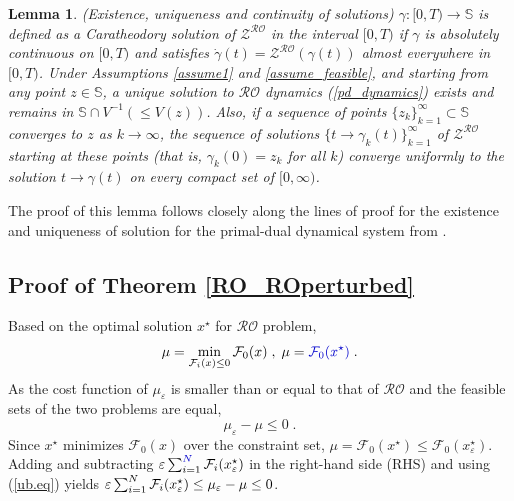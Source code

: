 \documentclass[journal,twoside,web]{ieeecolor}
\newcommand{\rev}[1]{\textcolor{revisionblue}{#1}}
\newtheorem{lemma}{Lemma}
\begin{document}
\begin{lemma} \label{uniq_exis}
(Existence, uniqueness and continuity of solutions)
$\gamma:[0,T) \rightarrow {\mathbb S}$ is defined as a Caratheodory solution of $\mathcal{Z}^{\mathcal{RO}}$ in the interval $[0,T)$ if $\gamma$ is absolutely continuous on $[0,T)$ and satisfies $\dot \gamma(t)=\mathcal{Z}^{\mathcal{RO}} (\gamma(t))$ almost everywhere in $[0,T)$.
Under Assumptions \ref{assume1} and \ref{assume_feasible}, and starting from any point $z\in \mathbb S$, a unique solution to $\mathcal{RO}$ dynamics (\ref{pd_dynamics}) exists and remains in $\mathbb S \cap V^{-1}(\leq V(z))$. Also, if a sequence of points $\{z_k\}_{k=1}^\infty \subset {\mathbb S}$ converges to $z$ as $k \rightarrow \infty$, the sequence of solutions $\{t \rightarrow \gamma_k(t)\}_{k=1}^\infty$ of $\mathcal{Z}^{\mathcal{RO}}$ starting at these points (that is, $\gamma_k(0)=z_k$ for all $k$) converge uniformly to the solution $t \rightarrow \gamma(t)$ on every compact set of $[0,\infty)$.
\end{lemma}
The proof of this lemma follows closely along the lines of proof for the existence and uniqueness of solution for the primal-dual dynamical system from \cite[Lemma~4.3]{cherukuri2016}.

\subsection*{Proof of Theorem \ref{RO_ROperturbed}}

Based on the optimal solution $x^\star$ for $\mathcal{RO}$ problem,
\begin{align*}
\mu=\min_{\mathcal{F}_i(x)\leq  0} \mathcal{F}_0(x)\;,\; \mu=\rev{\mathcal{F}_0(x^\star)}\;.
\end{align*}
As the cost function of $\mu_\varepsilon$ is smaller than or equal to that of $\mathcal{RO}$ and the feasible sets of the two problems are equal,
\begin{equation}\label{ub.eq}
 \mu_\varepsilon-\mu\leq 0\;.
\end{equation}
Since $x^\star$ minimizes $\mathcal{F}_0(x)$ over the constraint set, $\mu=\mathcal{F}_0(x^\star)\leq \mathcal{F}_0(x_\varepsilon^\star)$.
Adding and subtracting $\varepsilon\sum_{i=1}^{\rev{N}}\mathcal{F}_i(x^\star_\varepsilon)$
in the right-hand side (RHS) and using (\ref{ub.eq}) yields $\varepsilon \sum_{i=1}^N{\cal F}_{i}(x_\varepsilon^\star)\leq
\mu_\varepsilon-\mu\leq 0$\;.
\end{document}
